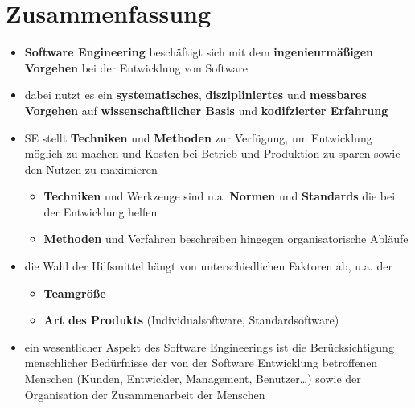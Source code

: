 \section{Zusammenfassung}

\begin{itemize}
    \item \textbf{Software Engineering} beschäftigt sich mit dem \textbf{ingenieurmäßigen Vorgehen} bei der Entwicklung von Software
    \item dabei nutzt es ein \textbf{systematisches}, \textbf{diszipliniertes} und \textbf{messbares Vorgehen} auf \textbf{wissenschaftlicher Basis} und \textbf{kodifzierter Erfahrung}
    \item SE stellt \textbf{Techniken} und \textbf{Methoden} zur Verfügung, um Entwicklung möglich zu machen und Kosten bei Betrieb und Produktion zu sparen sowie den Nutzen zu maximieren
        \begin{itemize}
            \item \textbf{Techniken} und Werkzeuge sind u.a. \textbf{Normen} und \textbf{Standards} die bei der Entwicklung helfen
            \item \textbf{Methoden} und Verfahren beschreiben hingegen organisatorische Abläufe
        \end{itemize}
    \item die Wahl der Hilfsmittel hängt von unterschiedlichen Faktoren ab, u.a. der
         \begin{itemize}
              \item \textbf{Teamgröße}
              \item \textbf{Art des Produkts} (Individualsoftware, Standardsoftware)
        \end{itemize}
    \item ein wesentlicher Aspekt des Software Engineerings ist die Berücksichtigung menschlicher Bedürfnisse der von der Software Entwicklung betroffenen Menschen (Kunden, Entwickler, Management, Benutzer\ldots) sowie der Organisation der Zusammenarbeit der Menschen
\end{itemize}